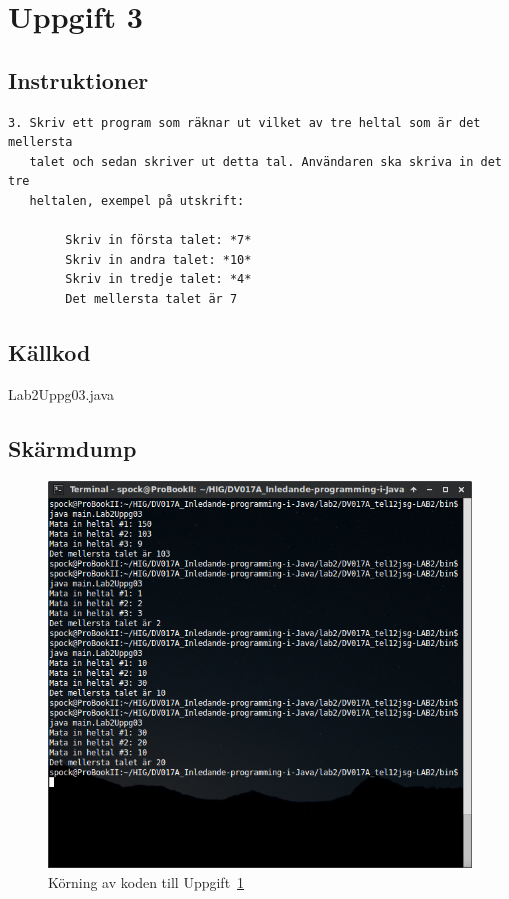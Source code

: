 \section{Uppgift 3}\label{sec:uppg03}

\subsection{Instruktioner}
\begin{verbatim}
3. Skriv ett program som räknar ut vilket av tre heltal som är det mellersta
   talet och sedan skriver ut detta tal. Användaren ska skriva in det tre
   heltalen, exempel på utskrift:

        Skriv in första talet: *7*
        Skriv in andra talet: *10*
        Skriv in tredje talet: *4*
        Det mellersta talet är 7
\end{verbatim}

%
%
%

\subsection{Källkod}
\caption{Lab2Uppg03.java}
\label{src:uppg03}


\subsection{Skärmdump}
\begin{figure}[htbp]
    \centering
        \includegraphics[width=\linewidth]{img/03.png}
    \caption{Körning av koden till Uppgift~\ref{sec:uppg03}}
\label{fig:uppg03-screenshot}
\end{figure}

